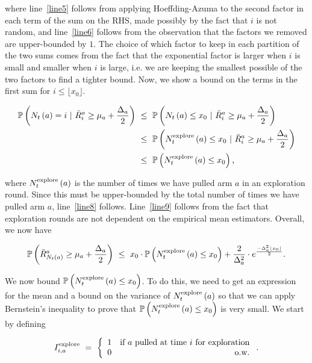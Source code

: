 \documentclass[11pt]{article}
\begin{document}
\noindent where line~\ref{line5} follows from applying Hoeffding-Azuma to the second factor in each term of the sum on the RHS, made possibly by the fact that $i$ is not random, and line~\ref{line6} follows from the observation that the factors we removed are upper-bounded by $1$. The choice of which factor to keep in each partition of the two sums comes from the fact that the exponential factor is larger when $i$ is small and smaller when $i$ is large, i.e. we are keeping the smallest possible of the two factors to find a tighter bound. Now, we show a bound on the terms in the first sum for $i \leq \lfloor x_0 \rfloor$.

\begin{align}
	\prob{N_t \left( a \right) = i\ |\ \bar{R}_i^a \geq \mu_a + \frac{\Delta_a}{2}}\ &\leq\ \prob{N_t \left( a \right) \leq x_0\ |\ \bar{R}_i^a \geq \mu_a + \frac{\Delta_a}{2}} \label{line7}\\
	&\leq\ \prob{N_t^{\textnormal{explore}} \left( a \right) \leq x_0\ |\ \bar{R}_i^a \geq \mu_a + \frac{\Delta_a}{2}} \label{line8}\\
	&\leq\ \prob{N_t^{\textnormal{explore}} \left( a \right) \leq x_0} \textnormal{,} \label{line9}
\end{align}

\noindent where $N_t^{\textnormal{explore}} \left( a \right)$ is the number of times we have pulled arm $a$ in an exploration round. Since this must be upper-bounded by the total number of times we have pulled arm $a$, line~\ref{line8} follows. Line~\ref{line9} follows from the fact that exploration rounds are not dependent on the empirical mean estimators. Overall, we now have

\begin{align}
	\mathbb{P}\left( \bar{R}_{N_t\left( a \right)}^a \geq \mu_a + \frac{\Delta_a}{2} \right)\ \leq\ x_0 \cdot \mathbb{P}\left( N_t^{\textnormal{explore}} \left( a \right) \leq x_0 \right) + \frac{2}{\Delta_a^2} \cdot e^{\frac{-\Delta_a^2 \lfloor x_0 \rfloor}{2}} \textnormal{.} \label{line10}
\end{align}

\noindent We now bound $\mathbb{P}\left( N_t^{\textnormal{explore}} \left( a \right) \leq x_0 \right)$. To do this, we need to get an expression for the mean and a bound on the variance of $N_t^{\textnormal{explore}} \left( a \right)$ so that we can apply Bernstein's inequality to prove that $\mathbb{P}\left( N_t^{\textnormal{explore}} \left( a \right) \leq x_0 \right)$ is very small. We start by defining 

\begin{align}
	I_{i,a}^{\textnormal{explore}}\ =\ \left \{ \begin{array}{l r}
	1 & \textnormal{if } a \textnormal{ pulled at time } i \textnormal{ for exploration}\\
	0 & \textnormal{o.w.}
	\end{array} \right. \textnormal{.}
\end{align} 
\end{document}
